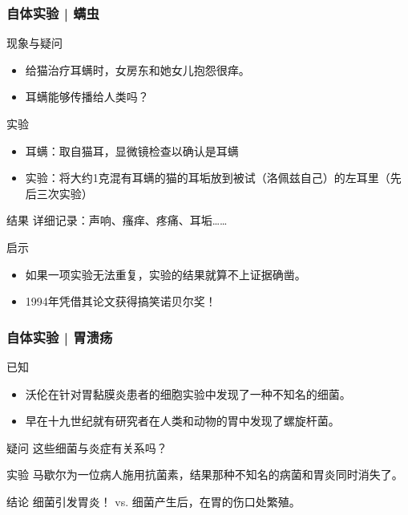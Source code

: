 \begin{frame}
  \frametitle{自体实验 | 螨虫}
  \begin{block}{现象与疑问}
    \begin{itemize}
      \item 给猫治疗耳螨时，女房东和她女儿抱怨很痒。
      \item 耳螨能够传播给人类吗？
    \end{itemize}
  \end{block}
  \vspace{-0.5em}
  \pause
  \begin{block}{实验}
    \begin{itemize}
      \item 耳螨：取自猫耳，显微镜检查以确认是耳螨
      \item 实验：将大约1克混有耳螨的猫的耳垢放到被试（洛佩兹自己）的左耳里（先后三次实验）
    \end{itemize}
  \end{block}
  \vspace{-0.5em}
  \pause
  \begin{block}{结果}
    详细记录：声响、瘙痒、疼痛、耳垢……
  \end{block}
  \vspace{-0.5em}
  \pause
  \begin{block}{启示}
    \begin{itemize}
      \item 如果一项实验无法重复，实验的结果就算不上证据确凿。
      \item 1994年凭借其论文获得搞笑诺贝尔奖！
    \end{itemize}
  \end{block}
\end{frame}

\begin{frame}
  \frametitle{自体实验 | 胃溃疡}
  \begin{block}{已知}
    \begin{itemize}
      \item 沃伦在针对胃黏膜炎患者的细胞实验中发现了一种不知名的细菌。
      \item 早在十九世纪就有研究者在人类和动物的胃中发现了螺旋杆菌。
    \end{itemize}
  \end{block}
  \pause
  \begin{block}{疑问}
    这些细菌与炎症有关系吗？
  \end{block}
  \pause
  \begin{block}{实验}
    马歇尔为一位病人施用抗菌素，结果那种不知名的病菌和胃炎同时消失了。
  \end{block}
  \pause
  \begin{block}{结论}
    细菌引发胃炎！ vs. 细菌产生后，在胃的伤口处繁殖。
  \end{block}
\end{frame}

